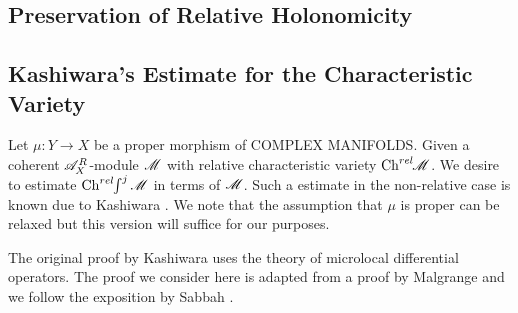 \subsection{Preservation of Relative Holonomicity} 
\subsection{Kashiwara's Estimate for the Characteristic Variety}
Let $\mu:Y\to X$ be a proper morphism of COMPLEX MANIFOLDS. Given a coherent $\mathscr{A}_X^R$-module $\mathscr{M}$ with relative characteristic variety $\operatorname{Ch}^{rel}\mkern-5mu \mathscr{M}$. We desire to estimate $\operatorname{Ch}^{rel}\mkern-5mu \int^j \mathscr{M}$ in terms of $\mathscr{M}$. Such a estimate in the non-relative case is known due to Kashiwara \cite{kashiwara1976b}.  We note that the assumption that $\mu$ is proper can be relaxed but this version will suffice for our purposes.

The original proof by Kashiwara \cite{kashiwara1976b} uses the theory of microlocal differential operators. The proof we consider here is adapted from a proof by Malgrange \cite{malgrange1985images} and we follow the exposition by Sabbah \cite[p36]{sabbah2011introduction}. 

